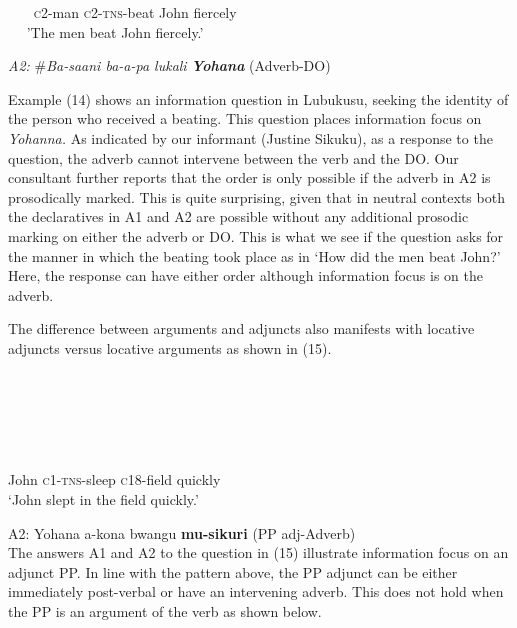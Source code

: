 \documentclass[output=paper]{langsci/langscibook}
\begin{document}
     ~~~   \textsc{c}2-man   \textsc{c2-tns}-beat   John     fiercely\\
~~   'The men beat John fiercely.'
\z

\glt \textit{A2:}  \#\textit{Ba-saani  ba-a-pa  lukali}    \textbf{\textit{Yohana}}  (Adverb-DO)  
\z

Example (14) shows an information question in Lubukusu, seeking the identity of the person who received a beating. This question places information focus on \textit{Yohanna.} As indicated by our informant (Justine Sikuku), as a response to the question, the adverb cannot intervene between the verb and the DO. Our consultant further reports that the order is only possible if the adverb in A2 is prosodically marked. This is quite surprising, given that in neutral contexts both the declaratives in A1 and A2 are possible without any additional prosodic marking on either the adverb or DO. This is what we see if the question asks for the manner in which the beating took place as in ‘How did the men beat John?’ Here, the response can have either order although information focus is on the adverb. 

  The difference between arguments and adjuncts also manifests with locative adjuncts versus locative arguments as shown in (15).  


\ea\label{ex:}
  \\
\ea\label{ex:}
\\
\ea\label{ex:}
\\
\ea\label{ex:}
\\
\ea\label{ex:}
\\

       John     \textsc{c1-tns}-sleep  \textsc{c}18-field   quickly   \\
\glt   ‘John slept in the field quickly.’
\z

\gll A2:  Yohana  a-kona    bwangu  \textbf{mu-sikuri}  (PP adj-Adverb)\\
The answers A1 and A2 to the question in (15) illustrate information focus on an adjunct PP. In line with the pattern above, the PP adjunct can be either immediately post-verbal or have an intervening adverb. This does not hold when the PP is an argument of the verb as shown below.  
\end{document}
